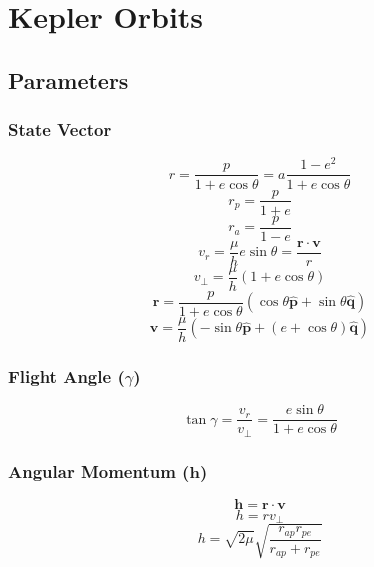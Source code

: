 \section{Kepler Orbits}

\subsection{Parameters}

\subsubsection{State Vector}
\begin{equation}
    r = \frac{p}{1+e\cos{\theta}} = a\frac{1-e^2}{1+e\cos{\theta}}
\end{equation}
\begin{equation}
    r_{p} = \frac{p}{1+e}
\end{equation}
\begin{equation}
    r_{a} = \frac{p}{1-e}
\end{equation}
\begin{equation}
    v_r = \frac{\mu}{h}e\sin{\theta} = \frac{\mathbf{r}\cdot\mathbf{v}}{r}
\end{equation}
\begin{equation}
    v_{\bot} = \frac{\mu}{h}\left(1+e\cos{\theta}\right)
\end{equation}
\begin{equation}
    \mathbf{r} = \frac{p}{1+e\cos{\theta}}\left(\cos{\theta}\hat{\mathbf{p}} + \sin{\theta}\hat{\mathbf{q}}\right)
\end{equation}
\begin{equation}
    \mathbf{v} = \frac{\mu}{h}\left(-\sin{\theta}\hat{\mathbf{p}} + \left(e+\cos{\theta}\right)\hat{\mathbf{q}}\right)
\end{equation}


\subsubsection{Flight Angle ($\gamma$)}
\begin{equation}
    \tan{\gamma}=\frac{v_r}{v_{\bot}}=\frac{e\sin{\theta}}{1+e\cos{\theta}}
\end{equation}


\subsubsection{Angular Momentum ($\mathbf{h}$)}
\begin{equation}
    \mathbf{h} = \mathbf{r} \cdot \mathbf{v}
\end{equation}
\begin{equation}
    h = rv_{\bot}
\end{equation}
\begin{equation}
    h = \sqrt{2\mu}\sqrt{\frac{r_{ap}r_{pe}}{r_{ap}+r_{pe}}}
\end{equation}

